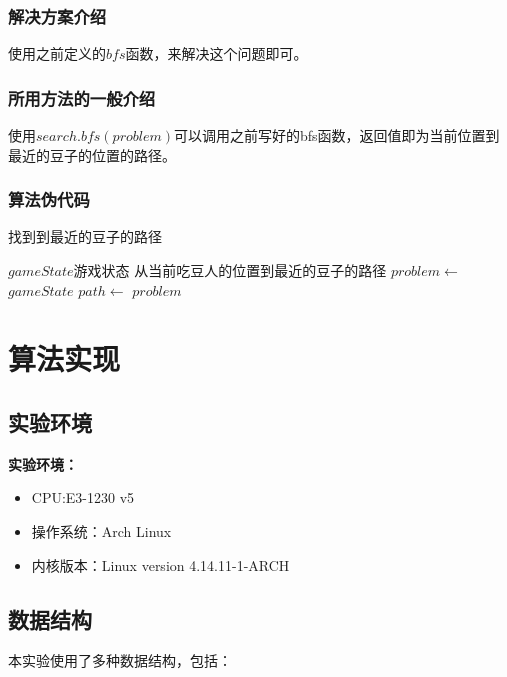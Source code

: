 \documentclass[forprint]{WHUBachelor}
\begin{document}
\subsection{解决方案介绍}

使用之前定义的$bfs$函数，来解决这个问题即可。

\subsection{所用方法的一般介绍}

使用$search.bfs(problem)$可以调用之前写好的bfs函数，返回值即为当前位置到最近的豆子的位置的路径。

\subsection{算法伪代码}

\begin{algorithm}[H]
  \caption{找到到最近的豆子的路径}
  \begin{algorithmic}[1] %
    \Require $gameState$游戏状态
    \Ensure 从当前吃豆人的位置到最近的豆子的路径
    \State $problem \gets $  {$gameState$}
    \State $path \gets $  {$problem$}
    \State {}
  \end{algorithmic}
\end{algorithm}

\chapter{算法实现}

\section{实验环境}

\textbf{实验环境：}

\begin{itemize}
\item CPU:E3-1230 v5
\item 操作系统：Arch Linux
\item 内核版本：Linux version 4.14.11-1-ARCH
\end{itemize}

\section{数据结构}

本实验使用了多种数据结构，包括：
\end{document}

